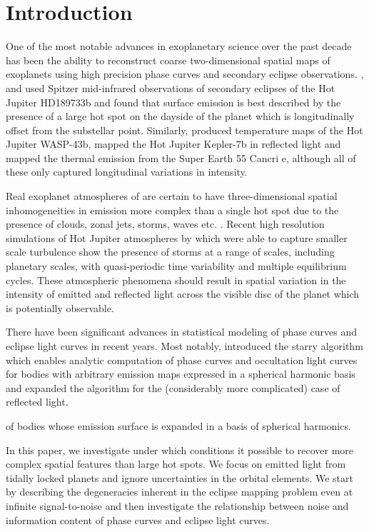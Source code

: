 \documentclass[modern]{aastex631}
\begin{document}
\section{Introduction}
\label{sec:introduction}
One of the most notable advances in exoplanetary science over the past decade has been the ability
to reconstruct coarse two-dimensional spatial maps of exoplanets using high precision phase 
curves and secondary eclipse observations.
\cite{knutson2007}, \cite{majeau2012b} and \cite{dewit2012} used Spitzer mid-infrared observations 
of secondary eclipses of the Hot Jupiter HD189733b and found that surface emission is best 
described by the presence of a large hot spot on the dayside of the planet which is 
longitudinally offset from the substellar point. 
Similarly, \cite{stevenson2014} produced temperature maps of the Hot Jupiter WASP-43b, 
\cite{demory2013} mapped the Hot Jupiter Kepler-7b in reflected light and \cite{demory2016a} 
mapped the thermal emission from the Super Earth 55 Cancri e, although all of these only 
captured longitudinal variations in intensity.

Real exoplanet atmospheres of are certain to have three-dimensional spatial 
inhomogeneities in emission more complex than a single hot spot due to the presence of clouds, zonal 
jets, storms, waves etc. \citep{showman2020}.
Recent high resolution simulations of Hot Jupiter atmospheres by \cite{cho2021} which were able 
to capture smaller scale turbulence show the presence of storms at a range of scales, including 
planetary scales, with quasi-periodic time variability and multiple equilibrium cycles.
These atmospheric phenomena should result in spatial variation in the intensity of emitted 
and reflected light across the visible disc of the planet which is potentially observable.

There have been significant advances in statistical modeling of phase curves and eclipse light
curves in recent years.
Most notably, \cite{luger2019a} introduced the \textsf{starry} algorithm which enables analytic
computation of phase curves and occultation light curves for bodies with arbitrary emission maps 
expressed in a spherical harmonic basis and\cite{luger2021d} expanded the algorithm for the (considerably more complicated) case of 
reflected light.

of bodies whose emission surface is 
expanded in a basis of spherical harmonics. 


In this paper, we investigate under which conditions it possible to recover more complex 
spatial features than large hot spots. 
We focus on emitted light from tidally locked planets and ignore uncertainties in the 
orbital elements.  
We start by describing the degeneracies inherent in the eclipse mapping problem even at 
infinite signal-to-noise and then investigate the relationship between noise and information 
content of phase curves and eclipse light curves. 
\end{document}
